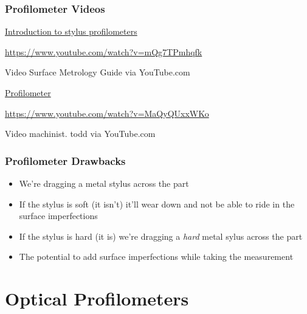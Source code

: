 \begin{frame}
    \frametitle{Profilometer Videos}

    \centering
    {\large \href{https://www.youtube.com/watch?v=mQg7TPmhqfk}{Introduction to stylus profilometers}\par}

    \vspace{0.5em}
    {\footnotesize \href{https://www.youtube.com/watch?v=mQg7TPmhqfk}{https://www.youtube.com/watch?v=mQg7TPmhqfk}\par}

    \vspace{0.5em}
    {\tiny Video \textcopyright{} Surface Metrology Guide via YouTube.com\par}

    \vspace{0.5in}

    {\large \href{https://www.youtube.com/watch?v=MaQyQUxxWKo}{Profilometer}\par}

    \vspace{0.5em}
    {\footnotesize \href{https://www.youtube.com/watch?v=MaQyQUxxWKo}{https://www.youtube.com/watch?v=MaQyQUxxWKo}\par}

    \vspace{0.5em}
    {\tiny Video \textcopyright{} machinist. todd via YouTube.com\par}
\end{frame}

\begin{frame}
	\frametitle{Profilometer Drawbacks}

    \begin{itemize}[<+- | alert@+>]
        \item We're dragging a metal stylus across the part
        \item If the stylus is soft (it isn't) it'll wear down and not be able to ride in the surface imperfections
        \item If the stylus is hard (it is) we're dragging a \emph{hard} metal sylus across the part
        \item The potential to add surface imperfections while taking the measurement
    \end{itemize}
\end{frame}

\section{Optical Profilometers}

